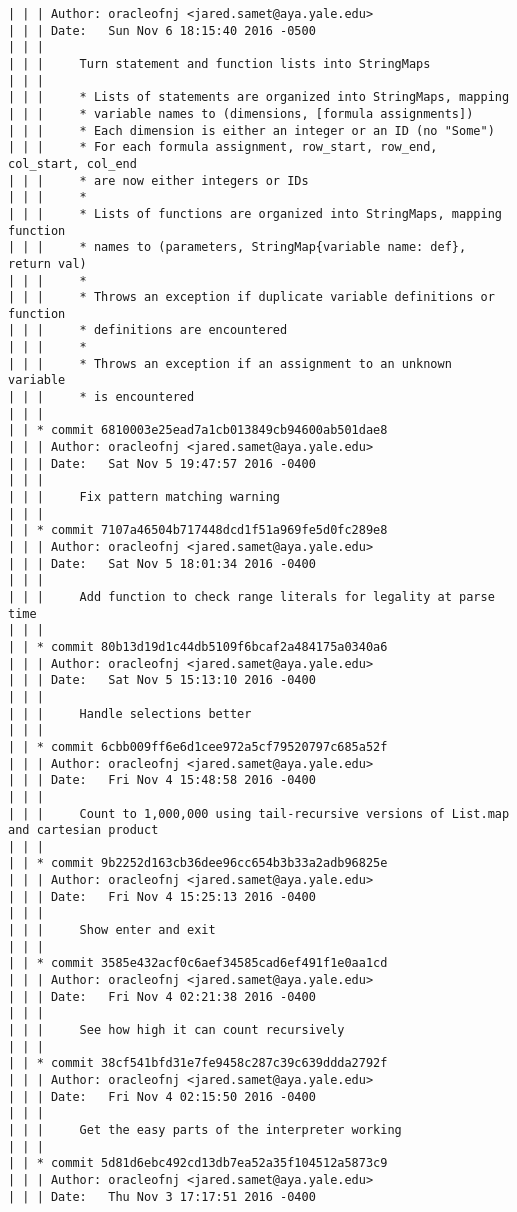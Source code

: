 \begin{lstlisting}
| | | Author: oracleofnj <jared.samet@aya.yale.edu>
| | | Date:   Sun Nov 6 18:15:40 2016 -0500
| | | 
| | |     Turn statement and function lists into StringMaps
| | |     
| | |     * Lists of statements are organized into StringMaps, mapping
| | |     * variable names to (dimensions, [formula assignments])
| | |     * Each dimension is either an integer or an ID (no "Some")
| | |     * For each formula assignment, row_start, row_end, col_start, col_end
| | |     * are now either integers or IDs
| | |     *
| | |     * Lists of functions are organized into StringMaps, mapping function
| | |     * names to (parameters, StringMap{variable name: def}, return val)
| | |     *
| | |     * Throws an exception if duplicate variable definitions or function
| | |     * definitions are encountered
| | |     *
| | |     * Throws an exception if an assignment to an unknown variable
| | |     * is encountered
| | |    
| | * commit 6810003e25ead7a1cb013849cb94600ab501dae8
| | | Author: oracleofnj <jared.samet@aya.yale.edu>
| | | Date:   Sat Nov 5 19:47:57 2016 -0400
| | | 
| | |     Fix pattern matching warning
| | |    
| | * commit 7107a46504b717448dcd1f51a969fe5d0fc289e8
| | | Author: oracleofnj <jared.samet@aya.yale.edu>
| | | Date:   Sat Nov 5 18:01:34 2016 -0400
| | | 
| | |     Add function to check range literals for legality at parse time
| | |    
| | * commit 80b13d19d1c44db5109f6bcaf2a484175a0340a6
| | | Author: oracleofnj <jared.samet@aya.yale.edu>
| | | Date:   Sat Nov 5 15:13:10 2016 -0400
| | | 
| | |     Handle selections better
| | |    
| | * commit 6cbb009ff6e6d1cee972a5cf79520797c685a52f
| | | Author: oracleofnj <jared.samet@aya.yale.edu>
| | | Date:   Fri Nov 4 15:48:58 2016 -0400
| | | 
| | |     Count to 1,000,000 using tail-recursive versions of List.map and cartesian product
| | |    
| | * commit 9b2252d163cb36dee96cc654b3b33a2adb96825e
| | | Author: oracleofnj <jared.samet@aya.yale.edu>
| | | Date:   Fri Nov 4 15:25:13 2016 -0400
| | | 
| | |     Show enter and exit
| | |    
| | * commit 3585e432acf0c6aef34585cad6ef491f1e0aa1cd
| | | Author: oracleofnj <jared.samet@aya.yale.edu>
| | | Date:   Fri Nov 4 02:21:38 2016 -0400
| | | 
| | |     See how high it can count recursively
| | |    
| | * commit 38cf541bfd31e7fe9458c287c39c639ddda2792f
| | | Author: oracleofnj <jared.samet@aya.yale.edu>
| | | Date:   Fri Nov 4 02:15:50 2016 -0400
| | | 
| | |     Get the easy parts of the interpreter working
| | |    
| | * commit 5d81d6ebc492cd13db7ea52a35f104512a5873c9
| | | Author: oracleofnj <jared.samet@aya.yale.edu>
| | | Date:   Thu Nov 3 17:17:51 2016 -0400

\end{lstlisting}
